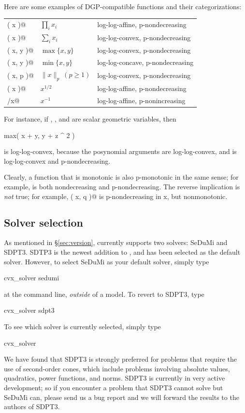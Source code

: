 \documentclass[12pt]{article}
\begin{document}
Here are some examples of DGP-compatible functions and their categorizations:
\begin{center}
\begin{tabular}{lll}
	\verb@prod( x )@    & $\prod_i x_i$& log-log-affine,  p-nondecreasing \\
	\verb@sum( x )@     & $\sum_i x_i$ & log-log-convex,  p-nondecreasing \\
	\verb@max( x, y )@  & $\max\{x,y\}$ & log-log-convex, p-nondecreasing \\
	\verb@min( x, y )@  & $\min\{x,y\}$ & log-log-concave, p-nondecreasing \\
	\verb@norm( x, p )@ & $\|x\|_p~(p\geq 1)$ & log-log-convex,  p-nondecreasing \\ 
	\verb@sqrt( x )@    & $x^{1/2}$    & log-log-affine, p-nondecreasing \\
	\verb@1/x@          & $x^{-1}$     & log-log-affine, p-nonincreasing
\end{tabular}
\end{center}
For instance, if \verb@x@, \verb@y@, and \verb@z@ are scalar geometric variables, then
\begin{code}
	max( x + y, y + z ^ 2 )
\end{code}
is log-log-convex, because the posynomial arguments are log-log-convex, and \verb@max@ is log-log-convex
and p-nondecreasing. 

Clearly, a function that is monotonic is also p-monotonic in the same sense;
for example, \verb@sum@ is both nondecreasing and p-nondecreasing. The
reverse implication is \emph{not} true; for example,
\verb@norm( x, q )@ is p-nondecreasing in x, but nonmonotonic.
\fi

\subsection{Solver selection}
\label{sec:solver}

As mentioned in \S\ref{sec:version}, \cvx currently supports two solvers: SeDuMi
and SDPT3. SDTP3 is the newest addition to \cvx, and has been selected as the
default solver. However, to select SeDuMi as your default solver, simply type
\begin{code2}
	cvx_solver sedumi
\end{code2}
at the command line, \emph{outside} of a \cvx model. To revert to SDPT3, type
\begin{code2}
	cvx_solver sdpt3
\end{code2}
To see which solver is currently selected, simply type
\begin{code2}
	cvx_solver
\end{code2}
We have found that SDPT3 is strongly preferred for problems that 
require the use of second-order cones, which include problems involving
absolute values, quadratics, power functions, and norms. SDPT3 is
currently in very active development; so if you
encounter a problem that SDPT3 cannot solve but SeDuMi can, 
please send us a bug report and we will forward the results to
the authors of SDPT3.
\end{document}
